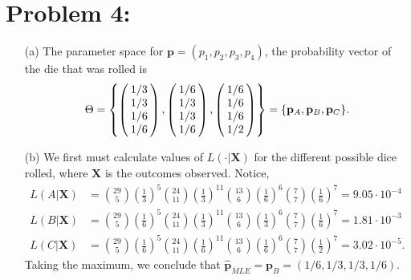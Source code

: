 \documentclass[11pt]{article}
\begin{document}
\section*{Problem 4:}
\begin{itemize}
\item[(a)]  The\hspace{-0.2mm} parameter space\hspace{-0.2mm} for $\mathbf{p} = (p_1,p_2,p_3,p_4)$,\hspace{-0.2mm} the probability\hspace{-0.2mm} vector of the\hspace{-0.2mm} die that\hspace{-0.2mm} was rolled\hspace{-0.3mm} is
\begin{align*}
\Theta = \left\{\left(\hspace{-1mm}\begin{array}{c}
1/3 \\
1/3 \\
1/6 \\
1/6
\end{array}\hspace{-1mm}\right),
\left(\hspace{-1mm}\begin{array}{c}
1/6 \\
1/3 \\
1/3 \\
1/6
\end{array}\hspace{-1mm}\right),
\left(\hspace{-1mm}\begin{array}{c}
1/6 \\
1/6 \\
1/6 \\
1/2
\end{array}\hspace{-1mm}\right)
\right\} = \{\mathbf{p}_A,\mathbf{p}_B,\mathbf{p}_C\}.
\end{align*}

\item[(b)]  We first must calculate values of $L(\cdot|\mathbf{X})$ for the different possible dice rolled, where $\mathbf{X}$ is the outcomes observed.  Notice,
\begin{align*}
L(A|\mathbf{X}) &= {29\choose 5}\left(\frac{1}{3}\right)^5{24\choose 11}\left(\frac{1}{3}\right)^{11}{13\choose 6}\left(\frac{1}{6}\right)^6{7\choose 7}\left(\frac{1}{6}\right)^7 = 9.05\cdot 10^{-4} \\
L(B|\mathbf{X}) &= {29\choose 5}\left(\frac{1}{6}\right)^5{24\choose 11}\left(\frac{1}{3}\right)^{11}{13\choose 6}\left(\frac{1}{3}\right)^6{7\choose 7}\left(\frac{1}{6}\right)^7 = 1.81 \cdot 10^{-3} \\
L(C|\mathbf{X}) &= {29\choose 5}\left(\frac{1}{6}\right)^5{24\choose 11}\left(\frac{1}{6}\right)^{11}{13\choose 6}\left(\frac{1}{6}\right)^6{7\choose 7}\left(\frac{1}{2}\right)^7 = 3.02\cdot 10^{-5}.
\end{align*}
Taking the maximum, we conclude that $\widehat{\mathbf{p}}_{MLE} = \mathbf{p}_{B} = (1/6, 1/3, 1/3, 1/6)$.


\end{itemize}
\end{document}
